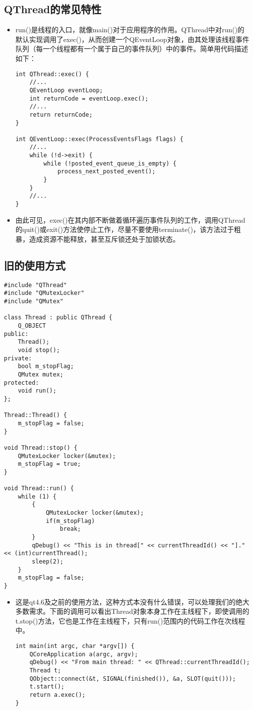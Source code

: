 \documentclass[9pt,b5paper]{article}
\begin{document}
\subsection{QThread的常见特性}
\label{sec-5-1}
\begin{itemize}
\item run()是线程的入口，就像main()对于应用程序的作用。QThread中对run()的默认实现调用了exec()，从而创建一个QEventLoop对象，由其处理该线程事件队列（每一个线程都有一个属于自己的事件队列）中的事件。简单用代码描述如下：
\lstset{language=java,label= ,caption= ,numbers=none}
\begin{lstlisting}
int QThread::exec() {
    //...
    QEventLoop eventLoop;
    int returnCode = eventLoop.exec();
    //...
    return returnCode;
}

int QEventLoop::exec(ProcessEventsFlags flags) {
    //...
    while (!d->exit) {
        while (!posted_event_queue_is_empty) {
            process_next_posted_event();
        }
    }
    //...
}
\end{lstlisting}
\item 由此可见，exec()在其内部不断做着循环遍历事件队列的工作，调用QThread的quit()或exit()方法使停止工作，尽量不要使用terminate()，该方法过于粗暴，造成资源不能释放，甚至互斥锁还处于加锁状态。
\end{itemize}
\subsection{旧的使用方式}
\label{sec-5-2}
\lstset{language=java,label= ,caption= ,numbers=none}
\begin{lstlisting}
#include "QThread"
#include "QMutexLocker"
#include "QMutex"

class Thread : public QThread {
    Q_OBJECT
public:
    Thread();
    void stop();
private:
    bool m_stopFlag;
    QMutex mutex;
protected:
    void run();
};

Thread::Thread() {
    m_stopFlag = false;
}
  
void Thread::stop() {
    QMutexLocker locker(&mutex);
    m_stopFlag = true;
}
  
void Thread::run() {
    while (1) {
        {
            QMutexLocker locker(&mutex);
            if(m_stopFlag)
                break;
        }
        qDebug() << "This is in thread[" << currentThreadId() << "]." << (int)currentThread();
        sleep(2);
    }
    m_stopFlag = false;
}
\end{lstlisting}
\begin{itemize}
\item 这是qt4.6及之前的使用方法，这种方式本没有什么错误，可以处理我们的绝大多数需求。下面的调用可以看出Thread对象本身工作在主线程下，即使调用的t.stop()方法，它也是工作在主线程下，只有run()范围内的代码工作在次线程中。

\lstset{language=java,label= ,caption= ,numbers=none}
\begin{lstlisting}
int main(int argc, char *argv[]) {
    QCoreApplication a(argc, argv);
    qDebug() << "From main thread: " << QThread::currentThreadId();
    Thread t;
    QObject::connect(&t, SIGNAL(finished()), &a, SLOT(quit()));
    t.start();
    return a.exec();
}
\end{lstlisting}
\end{itemize}
\end{document}
